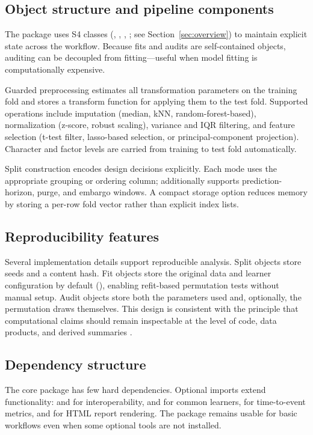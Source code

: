 \documentclass[article,shortnames]{jss}
\begin{document}
\subsection{Object structure and pipeline components}

The package uses S4 classes (, ,
, ; see Section~\ref{sec:overview})
to maintain explicit state across the workflow. Because fits and audits are
self-contained objects, auditing can be decoupled from fitting---useful
when model fitting is computationally expensive.

Guarded preprocessing estimates all transformation parameters on the training
fold and stores a transform function for applying them to the test fold.
Supported operations include imputation (median, kNN, random-forest-based),
normalization (z-score, robust scaling), variance and IQR filtering, and
feature selection (t-test filter, lasso-based selection, or
principal-component projection). Character and factor levels are carried
from training to test fold automatically.

Split construction encodes design decisions explicitly. Each mode uses the
appropriate grouping or ordering column;  additionally
supports prediction-horizon, purge, and embargo windows. A compact storage
option reduces memory by storing a per-row fold vector rather than explicit
index lists.

\subsection{Reproducibility features}

Several implementation details support reproducible analysis. Split objects
store seeds and a content hash. Fit objects store the original data and
learner configuration by default (),
enabling refit-based permutation tests without manual setup. Audit objects
store both the parameters used and, optionally, the permutation draws
themselves. This design is consistent with the principle that
computational claims should remain inspectable at the level of code, data
products, and derived summaries \citep{gentleman2007, peng2011, sandve2013}.

\subsection{Dependency structure}

The core package has few hard dependencies. Optional imports extend
functionality:  and  for 
interoperability,  and  for common learners,
 for time-to-event metrics, and  for HTML
report rendering. The package remains usable for basic workflows even when
some optional tools are not installed.
\end{document}
